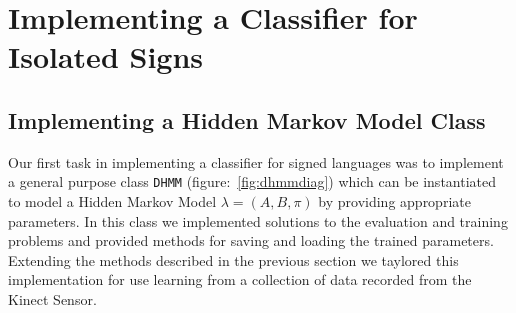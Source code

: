 \chapter{Implementing a Classifier for Isolated Signs}
\ifpdf
    \graphicspath{{Chapter2/Chapter2Figs/PNG/}{Chapter2/Chapter2Figs/PDF/}{Chapter2/Chapter2Figs/}}
\else
    \graphicspath{{Chapter2/Chapter2Figs/EPS/}{Chapter2/Chapter2Figs/}}
\fi

\section{Implementing a Hidden Markov Model Class}
Our first task in implementing a classifier for signed languages was to implement a general purpose class \verb|DHMM| (figure:~\ref{fig:dhmmdiag}) which can be instantiated to model a Hidden Markov Model $\lambda = (A,B,\pi)$ by providing appropriate parameters. In this class we implemented solutions to the evaluation and training problems and provided methods for saving and loading the trained parameters. Extending the methods described in the previous section we taylored this implementation for use learning from a collection of data recorded from the Kinect Sensor. 
